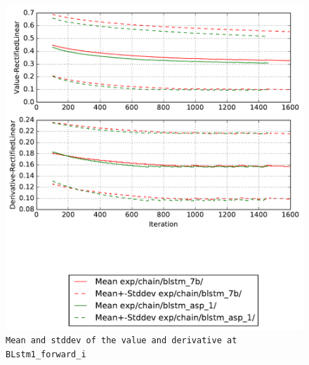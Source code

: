 \documentclass[prl,10pt,twocolumn]{revtex4}
\begin{document}
\newpage
\begin{figure}[h]
  \begin{center}
    \caption{\texttt{Mean and stddev of the value and derivative at BLstm1\_forward\_i}}
    \includegraphics[width=\textwidth]{exp/chain/blstm_7b/report/nonlinstats_BLstm1_forward_i.pdf}
  \end{center}
\end{figure}
\clearpage
\end{document}
